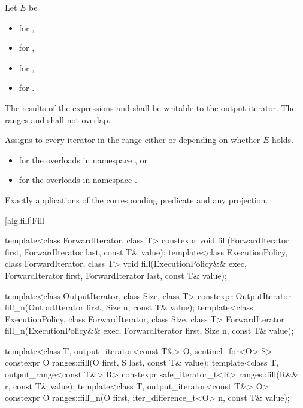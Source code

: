 \begin{itemdescr}
\setlength{\emergencystretch}{1.5em}
\pnum
Let $E$ be
\begin{itemize}
\item {}
  for ,
\item {}
  for ,
\item {}
  for ,
\item {}
  for .
\end{itemize}

\pnum
\requires
The results of the expressions  and 
shall be writable
to the  output iterator.
The ranges  and 
shall not overlap.

\pnum
\effects
Assigns to every iterator 
in the range 
either  or 
depending on whether $E$ holds.

\pnum
\returns
\begin{itemize}
\item
  for the overloads in namespace , or
\item
  for the overloads in namespace .
\end{itemize}

\pnum
\complexity
Exactly  applications
of the corresponding predicate and any projection.
\end{itemdescr}

[alg.fill]{Fill}

%
%
\begin{itemdecl}
template<class ForwardIterator, class T>
  constexpr void fill(ForwardIterator first, ForwardIterator last, const T& value);
template<class ExecutionPolicy, class ForwardIterator, class T>
  void fill(ExecutionPolicy&& exec,
            ForwardIterator first, ForwardIterator last, const T& value);

template<class OutputIterator, class Size, class T>
  constexpr OutputIterator fill_n(OutputIterator first, Size n, const T& value);
template<class ExecutionPolicy, class ForwardIterator, class Size, class T>
  ForwardIterator fill_n(ExecutionPolicy&& exec,
                         ForwardIterator first, Size n, const T& value);


template<class T, output_iterator<const T&> O, sentinel_for<O> S>
  constexpr O ranges::fill(O first, S last, const T& value);
template<class T, output_range<const T&> R>
  constexpr safe_iterator_t<R> ranges::fill(R&& r, const T& value);
template<class T, output_iterator<const T&> O>
  constexpr O ranges::fill_n(O first, iter_difference_t<O> n, const T& value);
\end{itemdecl}

